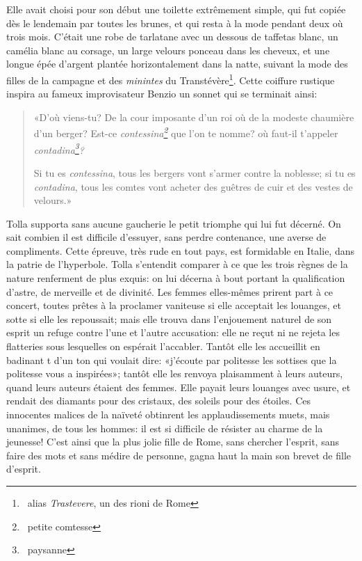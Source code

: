 Elle avait choisi pour son début une toilette extrêmement simple, qui fut copiée dès le lendemain par toutes les brunes, et qui resta à la mode pendant deux où trois mois. C’était une robe de tarlatane avec un dessous de taffetas blanc, un camélia blanc au corsage, un large velours ponceau dans les cheveux, et une longue épée d’argent plantée horizontalement dans la natte, suivant la mode des filles de la campagne et des \emph{minintes} du Transtévère\footnote{~alias \emph{Trastevere}, un des rioni de Rome}. Cette coiffure rustique inspira au fameux improvisateur Benzio un sonnet qui se terminait ainsi:

\begin{quote}
«D’où viens-tu? De la cour imposante d’un roi où de la modeste chaumière d’un berger? Est-ce \emph{contessina\footnote{~petite comtesse}} que l’on te nomme? où faut-il t’appeler \emph{contadina\footnote{~paysanne}?}

Si tu es \emph{contessina}, tous les bergers vont s’armer contre la noblesse; si tu es \emph{contadina}, tous les comtes vont acheter des guêtres de cuir et des vestes de velours.»
\end{quote}

Tolla supporta sans aucune gaucherie le petit triomphe qui lui fut décerné. On sait combien il est difficile d’essuyer, sans perdre contenance, une averse de compliments. Cette épreuve, très rude en tout pays, est formidable en Italie, dans la patrie de l’hyperbole. Tolla s’entendit comparer à ce que les trois règnes de la nature renferment de plus exquis: on lui décerna à bout portant la qualification d’astre, de merveille et de divinité. Les femmes elles-mêmes prirent part à ce concert, toutes prêtes à la proclamer vaniteuse si elle acceptait les louanges, et sotte si elle les repoussait; mais elle trouva dans l’enjouement naturel de son esprit un refuge contre l’une et l’autre accusation: elle ne reçut ni ne rejeta les flatteries sous lesquelles on espérait l’accabler. Tantôt elle les accueillit en badinant t d’un ton qui voulait dire: «j’écoute par politesse les sottises que la politesse vous a inspirées»; tantôt elle les renvoya plaisamment à leurs auteurs, quand leurs auteurs étaient des femmes. Elle payait leurs louanges avec usure, et rendait des diamants pour des cristaux, des soleils pour des étoiles. Ces innocentes malices de la naïveté obtinrent les applaudissements muets, mais unanimes, de tous les hommes: il est si difficile de résister au charme de la jeunesse! C’est ainsi que la plus jolie fille de Rome, sans chercher l’esprit, sans faire des mots et sans médire de personne, gagna haut la main son brevet de fille d’esprit.

